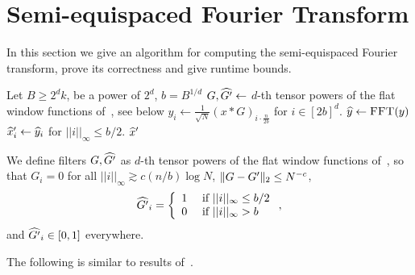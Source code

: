 \section{Semi-equispaced Fourier Transform}\label{sec:semiequi}
In this section we give an algorithm for computing the semi-equispaced Fourier transform, prove its correctness and give runtime bounds.
\begin{algorithm}[H]
\caption{Semi-equispaced Fourier Transform in $2^{O(d)}k \log^{d} N$ time}\label{alg:semi-fft}
\begin{algorithmic}[1]
\State Let $B\geq 2^d k$, be a power of $2^d$, $b=B^{1/d}$
\State $G, \wh{G'} \gets $ $d$-th tensor powers of the flat window functions of~\cite{HIKP2}, see below
\State $y_i \gets \frac{1}{\sqrt{N}}(x * G)_{i\cdot \frac{n}{2b}}$ for $i \in [2b]^d$.
\State $\wh{y} \gets \textsc{FFT}(y)$ 
\State $\wh{x}'_i \gets \wh{y}_i$ for $||i||_\infty \leq b/2$.
\State \Return $\wh{x}'$
\EndProcedure
\end{algorithmic}
\end{algorithm}

  We define filters $G, \wh{G'}$ as $d$-th tensor powers of the flat window functions of~\cite{HIKP2}, so
  that $G_i = 0$ for all $||i||_\infty \gtrsim c (n/b) \log N$,
  $\norm{2}{G -G'} \leq N^{-c}$,
  \[
  \wh{G'}_i = \left\{
    \begin{array}{cl}
      1 & \text{ if } ||i||_\infty \leq b/2\\
      0 & \text{ if } ||i||_\infty > b\\
    \end{array}
  \right.,
  \]
  and $\wh{G'}_i \in [0, 1]$ everywhere. 


The following is similar to results of~\cite{DR93, IKP}.

